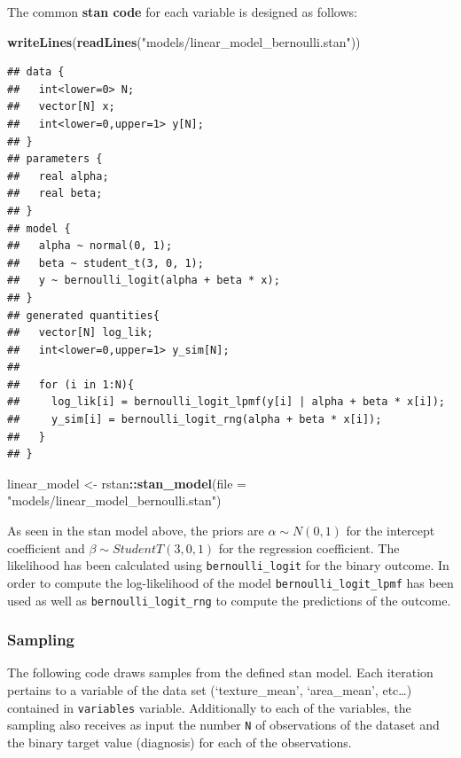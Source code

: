 \documentclass[
]{article}
\newenvironment{Shaded}{\begin{snugshade}}{\end{snugshade}}
\newcommand{\DataTypeTok}[1]{\textcolor[rgb]{0.13,0.29,0.53}{#1}}
\newcommand{\KeywordTok}[1]{\textcolor[rgb]{0.13,0.29,0.53}{\textbf{#1}}}
\newcommand{\NormalTok}[1]{#1}
\newcommand{\OperatorTok}[1]{\textcolor[rgb]{0.81,0.36,0.00}{\textbf{#1}}}
\newcommand{\StringTok}[1]{\textcolor[rgb]{0.31,0.60,0.02}{#1}}
\begin{document}
The common \textbf{stan code} for each variable is designed as follows:

\begin{Shaded}
\begin{Highlighting}[]
\KeywordTok{writeLines}\NormalTok{(}\KeywordTok{readLines}\NormalTok{(}\StringTok{"models/linear_model_bernoulli.stan"}\NormalTok{))}
\end{Highlighting}
\end{Shaded}

\begin{verbatim}
## data {
##   int<lower=0> N;
##   vector[N] x;
##   int<lower=0,upper=1> y[N];
## }
## parameters {
##   real alpha;
##   real beta;
## }
## model {
##   alpha ~ normal(0, 1);
##   beta ~ student_t(3, 0, 1);
##   y ~ bernoulli_logit(alpha + beta * x);
## }
## generated quantities{
##   vector[N] log_lik;
##   int<lower=0,upper=1> y_sim[N];
##   
##   for (i in 1:N){
##     log_lik[i] = bernoulli_logit_lpmf(y[i] | alpha + beta * x[i]);
##     y_sim[i] = bernoulli_logit_rng(alpha + beta * x[i]);
##   }
## }
\end{verbatim}

\begin{Shaded}
\begin{Highlighting}[]
\NormalTok{linear_model <-}\StringTok{ }\NormalTok{rstan}\OperatorTok{::}\KeywordTok{stan_model}\NormalTok{(}\DataTypeTok{file =} \StringTok{"models/linear_model_bernoulli.stan"}\NormalTok{)}
\end{Highlighting}
\end{Shaded}

As seen in the stan model above, the priors are \(\alpha \sim N(0,1)\)
for the intercept coefficient and \(\beta \sim StudentT(3,0,1)\) for the
regression coefficient. The likelihood has been calculated using
\texttt{bernoulli\_logit} for the binary outcome. In order to compute
the log-likelihood of the model \texttt{bernoulli\_logit\_lpmf} has been
used as well as \texttt{bernoulli\_logit\_rng} to compute the
predictions of the outcome.

\hypertarget{sampling}{%
\subsubsection{Sampling}\label{sampling}}

The following code draws samples from the defined stan model. Each
iteration pertains to a variable of the data set (`texture\_mean',
`area\_mean', etc\ldots) contained in \texttt{variables} variable.
Additionally to each of the variables, the sampling also receives as
input the number \texttt{N} of observations of the dataset and the
binary target value (diagnosis) for each of the observations.
\end{document}
